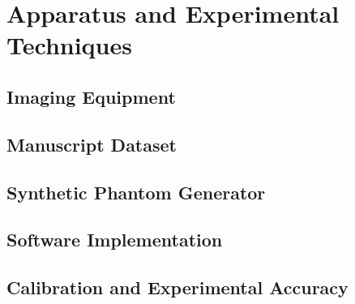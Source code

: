\section{Apparatus and Experimental Techniques}
\label{sec:apparatus}


\subsection{Imaging Equipment}
\label{sec:apparatus:hw}

\subsection{Manuscript Dataset}
\label{sec:apparatus:dataset}

\subsection{Synthetic Phantom Generator}
\label{sec:apparatus:phantom}

\subsection{Software Implementation}
\label{sec:apparatus:sw}

\subsection{Calibration and Experimental Accuracy}
\label{sec:apparatus:cal}
